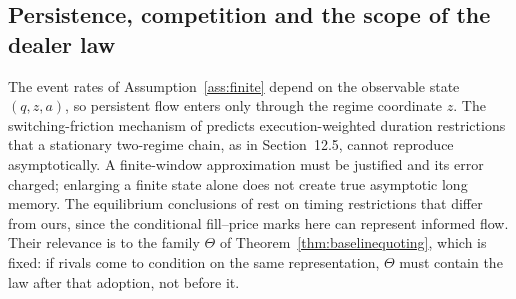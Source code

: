 \subsection{Persistence, competition and the scope of the dealer law}
The event rates of Assumption~\ref{ass:finite} depend on the observable state $(q,z,a)$, so
persistent flow enters only through the regime coordinate $z$. The
switching-friction mechanism of \citet{RodriguezDominguez2026Switching} predicts
execution-weighted duration restrictions that a stationary two-regime chain, as in Section~12.5, cannot reproduce
asymptotically. A finite-window approximation must be justified and its
error charged; enlarging a finite state alone does not create true
asymptotic long memory. The equilibrium
conclusions of \citet{RodriguezDominguez2026Market} rest on timing restrictions that
differ from ours, since the conditional fill--price marks here can represent
informed flow. Their relevance is to the family $\Theta$ of Theorem~\ref{thm:baselinequoting}, which is
fixed: if rivals come to condition on the same representation, $\Theta$ must
contain the law after that adoption, not before it.

